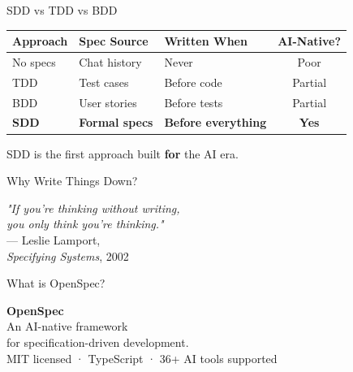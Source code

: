 \documentclass[aspectratio=169,18pt]{beamer}
\begin{document}
\begin{frame}{SDD vs TDD vs BDD}
  \vspace{0.3em}
  \begin{tabularx}{\textwidth}{l X X c}
    \toprule
    \textbf{Approach} & \textbf{Spec Source} & \textbf{Written When} & \textbf{AI-Native?} \\
    \midrule
    No specs    & Chat history     & Never              & \color{openred}Poor \\
    TDD         & Test cases       & Before code        & \color{opengray}Partial \\
    BDD         & User stories     & Before tests       & \color{opengray}Partial \\
    \textbf{SDD} & \textbf{Formal specs} & \textbf{Before everything} & \color{opengreen}\textbf{Yes} \\
    \bottomrule
  \end{tabularx}
  \vspace{1em}
  SDD is the first approach built \textbf{for} the AI era.
\end{frame}

\begin{frame}{Why Write Things Down?}
  \vspace{2em}
  \begin{center}
    \large\textit{"If you're thinking without writing,\\
    you only think you're thinking."}\\[1.2em]
    \normalsize\color{opengray}— Leslie Lamport,\\ \textit{Specifying Systems}, 2002
  \end{center}
\end{frame}


\begin{frame}{What is OpenSpec?}
  \vspace{1.5em}
  \begin{center}
    {\Large\textbf{OpenSpec}}\\[1em]
    \normalsize
    An AI-native framework\\
    for specification-driven development.\\[1.5em]
    \small\color{opengray}MIT licensed · TypeScript · 36+ AI tools supported
  \end{center}
\end{frame}
\end{document}
